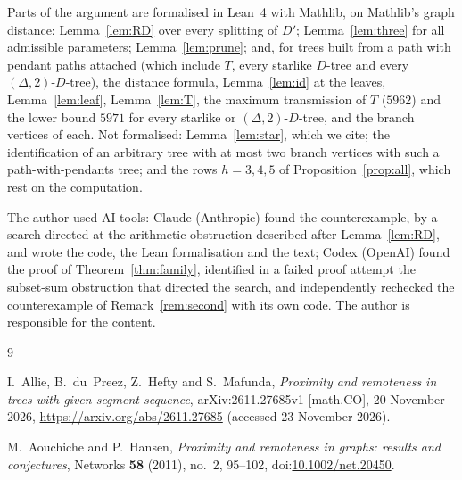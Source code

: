 \documentclass[11pt]{amsart}
\newcommand{\doi}[1]{doi:\href{https://doi.org/#1}{#1}}
\theoremstyle{definition}
\begin{document}
Parts of the argument are formalised in Lean~4 with Mathlib, on Mathlib's graph distance: Lemma~\ref{lem:RD} over
every splitting of $D'$; Lemma~\ref{lem:three} for all admissible parameters; Lemma~\ref{lem:prune}; and, for trees
built from a path with pendant paths attached (which include $T$, every starlike $D$-tree and every
$(\Delta,2)$-$D$-tree), the distance formula, Lemma~\ref{lem:id} at the leaves, Lemma~\ref{lem:leaf}, Lemma~\ref{lem:T}, the maximum
transmission of $T$ ($5962$) and the lower bound $5971$ for every starlike or $(\Delta,2)$-$D$-tree, and the branch
vertices of each. Not formalised: Lemma~\ref{lem:star}, which we cite; the identification of an arbitrary tree with at
most two branch vertices with such a path-with-pendants tree; and the rows $h=3,4,5$ of Proposition~\ref{prop:all},
which rest on the computation.

The author used AI tools: Claude (Anthropic) found the counterexample, by a search directed at the arithmetic
obstruction described after Lemma~\ref{lem:RD}, and wrote the code, the Lean formalisation and the text; Codex (OpenAI) found the proof of
Theorem~\ref{thm:family}, identified in a failed proof attempt the subset-sum obstruction that directed the search, and
independently rechecked the counterexample of Remark~\ref{rem:second} with its own code.
The author is responsible for the content.

\begin{thebibliography}{9}

I.~Allie, B.~du~Preez, Z.~Hefty and S.~Mafunda, \emph{Proximity and remoteness in trees with given segment sequence},
arXiv:2611.27685v1 [math.CO], 20 November 2026, \url{https://arxiv.org/abs/2611.27685} (accessed 23 November 2026).

M.~Aouchiche and P.~Hansen, \emph{Proximity and remoteness in graphs: results and conjectures}, Networks \textbf{58}
(2011), no.~2, 95--102, \doi{10.1002/net.20450}.

\end{thebibliography}
\end{document}
